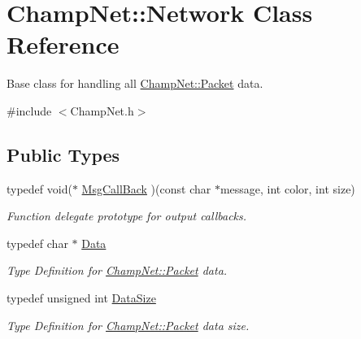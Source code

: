 \hypertarget{class_champ_net_1_1_network}{\section{Champ\-Net\-:\-:Network Class Reference}
\label{class_champ_net_1_1_network}
}


Base class for handling all \hyperlink{class_champ_net_1_1_packet}{Champ\-Net\-::\-Packet} data.  




{\ttfamily \#include $<$Champ\-Net.\-h$>$}

\subsection*{Public Types}
\begin{DoxyCompactItemize}
\item 
\hypertarget{class_champ_net_1_1_network_a3f98f6ee0fd5617faa5679162195b39a}{typedef void($\ast$ \hyperlink{class_champ_net_1_1_network_a3f98f6ee0fd5617faa5679162195b39a}{Msg\-Call\-Back} )(const char $\ast$message, int color, int size)}\label{class_champ_net_1_1_network_a3f98f6ee0fd5617faa5679162195b39a}

\begin{DoxyCompactList}\small\item\em Function delegate prototype for output callbacks. \end{DoxyCompactList}\item 
\hypertarget{class_champ_net_1_1_network_af03ef34820a69b9ef3f2dc3065a29c3f}{typedef char $\ast$ \hyperlink{class_champ_net_1_1_network_af03ef34820a69b9ef3f2dc3065a29c3f}{Data}}\label{class_champ_net_1_1_network_af03ef34820a69b9ef3f2dc3065a29c3f}

\begin{DoxyCompactList}\small\item\em Type Definition for \hyperlink{class_champ_net_1_1_packet}{Champ\-Net\-::\-Packet} data. \end{DoxyCompactList}\item 
\hypertarget{class_champ_net_1_1_network_a5f153a3f9a1687d10922c946e2f0662e}{typedef unsigned int \hyperlink{class_champ_net_1_1_network_a5f153a3f9a1687d10922c946e2f0662e}{Data\-Size}}\label{class_champ_net_1_1_network_a5f153a3f9a1687d10922c946e2f0662e}

\begin{DoxyCompactList}\small\item\em Type Definition for \hyperlink{class_champ_net_1_1_packet}{Champ\-Net\-::\-Packet} data size. \end{DoxyCompactList}\end{DoxyCompactItemize}
